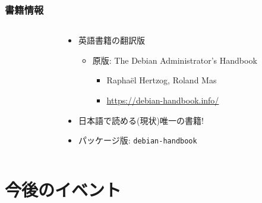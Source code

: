 \documentclass[cjk,c,squeeze,shrink,dvipdfmx,12pt]{beamer}
\begin{document}
\begin{frame}
  \frametitle{書籍情報}
  \begin{columns}
    \begin{column}{.45\paperwidth}
      \centering
    \end{column}
    \begin{column}{.54\paperwidth}
      \begin{itemize}
      \item %
        英語書籍の翻訳版
        \begin{itemize}
        \item %
          原版: The Debian Administrator's Handbook
          \begin{itemize}
          \item %
            Rapha\"el Hertzog, Roland Mas
          \item \url{https://debian-handbook.info/}
          \end{itemize}
        \end{itemize}
      \item %
        日本語で読める(現状)唯一の書籍!
      \item %
        パッケージ版:
        \texttt{debian-handbook}
      \end{itemize}
    \end{column}
  \end{columns}
\end{frame}



\section{今後のイベント}

\end{document}
